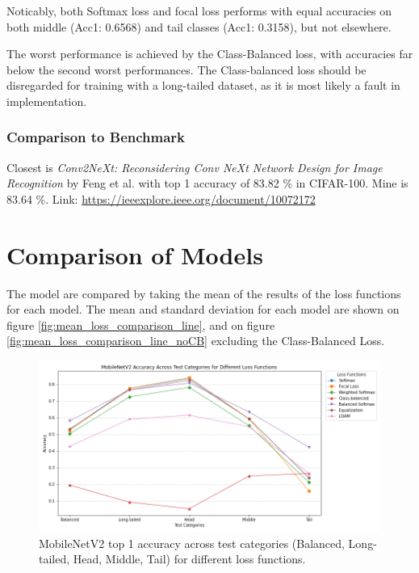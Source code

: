 Noticably, both Softmax loss and focal loss performs with equal accuracies on both middle (Acc1: 0.6568) and tail classes (Acc1: 0.3158), but not elsewhere. 

The worst performance is achieved by the Class-Balanced loss, with accuracies far below the second worst performances. The Class-balanced loss should be disregarded for training with a long-tailed dataset, as it is most likely a fault in implementation. 


\subsubsection{Comparison to Benchmark}
Closest is \textit{Conv2NeXt: Reconsidering Conv NeXt Network Design for Image Recognition} by Feng et al. with top 1 accuracy of 83.82 \% in CIFAR-100. Mine is 83.64 \%.
Link: \url{https://ieeexplore.ieee.org/document/10072172}

\section{Comparison of Models}

The model are compared by taking the mean of the results of the loss functions for each model. The mean and standard deviation for each model are shown on figure \ref{fig:mean_loss_comparison_line}, and on figure \ref{fig:mean_loss_comparison_line_noCB} excluding the Class-Balanced Loss.

\begin{figure}[h!]
    \centering
    \includegraphics[width=\textwidth]{Images/Plots/mobilenet_lt_loss_comparison_line.png}
    \caption{MobileNetV2 top 1 accuracy across test categories (Balanced, Long-tailed, Head, Middle, Tail) for different loss functions.}
    \label{fig:mobilenet_bal_loss_comparison_line}
\end{figure}

